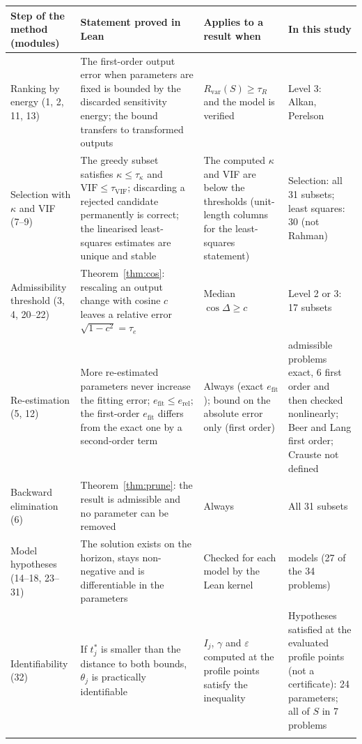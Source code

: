 \begin{tabular}{@{}>{\raggedright\arraybackslash}p{2.2cm}>{\raggedright\arraybackslash}p{4.1cm}>{\raggedright\arraybackslash}p{3.0cm}>{\raggedright\arraybackslash}p{2.5cm}@{}}
\toprule
Step of the method (modules) & Statement proved in Lean & Applies to a result when & In this study \\
\midrule
Ranking by energy (1, 2, 11, 13) & The first-order output error when parameters are fixed is bounded by the discarded sensitivity energy; the bound transfers to transformed outputs & $R_{\mathrm{var}}(S)\ge\tau_R$ and the model is verified & Level 3: Alkan, Perelson \\
Selection with $\kappa$ and VIF (7--9) & The greedy subset satisfies $\kappa\le\tau_\kappa$ and $\mathrm{VIF}\le\tau_{\mathrm{VIF}}$; discarding a rejected candidate permanently is correct; the linearised least-squares estimates are unique and stable & The computed $\kappa$ and VIF are below the thresholds (unit-length columns for the least-squares statement) & Selection: all 31 subsets; least squares: 30 (not Rahman) \\
Admissibility threshold (3, 4, 20--22) & Theorem~\ref{thm:cos}: rescaling an output change with cosine $c$ leaves a relative error $\sqrt{1-c^2}=\tau_e$ & Median $\cos\Delta\ge c$ & Level 2 or 3: 17 subsets \\
Re-estimation (5, 12) & More re-estimated parameters never increase the fitting error; $e_{\mathrm{fit}}\le e_{\mathrm{rel}}$; the first-order $e_{\mathrm{fit}}$ differs from the exact one by a second-order term & Always (exact $e_{\mathrm{fit}}$); bound on the absolute error only (first order) & 25 admissible problems exact, 6 first order and then checked nonlinearly; Beer and Lang first order; Crauste not defined \\
Backward elimination (6) & Theorem~\ref{thm:prune}: the result is admissible and no parameter can be removed & Always & All 31 subsets \\
Model hypotheses (14--18, 23--31) & The solution exists on the horizon, stays non-negative and is differentiable in the parameters & Checked for each model by the Lean kernel & 28 models (27 of the 34 problems) \\
Identifiability (32) & If $t^{\ast}_j$ is smaller than the distance to both bounds, $\theta_j$ is practically identifiable & $I_j$, $\gamma$ and $\varepsilon$ computed at the profile points satisfy the inequality & Hypotheses satisfied at the evaluated profile points (not a certificate): 24 parameters; all of $S$ in 7 problems \\
\botrule
\end{tabular}

